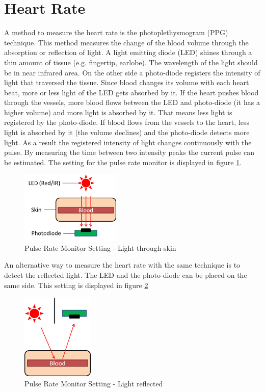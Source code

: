 \documentclass[notitlepage]{scrreprt}
\begin{document}
\section{Heart Rate}
A method to measure the heart rate is the photoplethysmogram (PPG) technique. This method measures the change of the blood volume through the absorption or reflection of light. A light emitting diode (LED) shines through a thin amount of tissue (e.g. fingertip, earlobe). The wavelength of the light should be in near infrared area. On the other side a photo-diode registers the intensity of light that traversed the tissue. Since blood changes its volume with each heart beat, more or less light of the LED gets absorbed by it. If the heart pushes blood through the vessels, more blood flows between the LED and photo-diode (it has a higher volume) and more light is absorbed by it. That means less light is registered by the photo-diode. If blood flows from the vessels to the heart, less light is absorbed by it (the volume declines) and the photo-diode detects more light. As a result the registered intensity of light changes continuously with the pulse. By measuring the time between two intensity peaks the current pulse can be estimated. The setting for the pulse rate monitor is displayed in figure \ref{fig:pulse-rate-monitor-setting}.

\begin{figure}[H]
	\centering
	\includegraphics[width=180px]{images/pulse-rate-aufbau.png}
	\caption{Pulse Rate Monitor Setting - Light through skin}
	\label{fig:pulse-rate-monitor-setting}
\end{figure}

\newpage

An alternative way to measure the heart rate with the same technique is to detect the reflected light. The LED and the photo-diode can be placed on the same side. This setting is displayed in figure \ref{fig:pulse-rate-monitor-setting2}

\begin{figure}[H]
	\centering
	\includegraphics[width=130px]{images/pulse-rate-aufbau2.png}
	\caption{Pulse Rate Monitor Setting - Light reflected}
	\label{fig:pulse-rate-monitor-setting2}
\end{figure}
\end{document}
